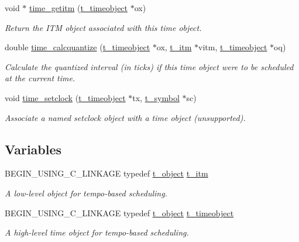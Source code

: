 \begin{DoxyCompactItemize}
void $\ast$ \hyperlink{group__time_gaa1d217d3b706f718f0f77dbd78427fb0}{time\_\-getitm} (\hyperlink{group__time_gab568d2ffd4d84ca17c0b90cf2f7c6a40}{t\_\-timeobject} $\ast$ox)
\begin{DoxyCompactList}\small\item\em Return the ITM object associated with this time object. \item\end{DoxyCompactList}\item 
double \hyperlink{group__time_gab5d282bae56be219c0c863a798140cb5}{time\_\-calcquantize} (\hyperlink{group__time_gab568d2ffd4d84ca17c0b90cf2f7c6a40}{t\_\-timeobject} $\ast$ox, \hyperlink{group__time_gac656fa1f920c69cf77e6631bcec53077}{t\_\-itm} $\ast$vitm, \hyperlink{group__time_gab568d2ffd4d84ca17c0b90cf2f7c6a40}{t\_\-timeobject} $\ast$oq)
\begin{DoxyCompactList}\small\item\em Calculate the quantized interval (in ticks) if this time object were to be scheduled at the current time. \item\end{DoxyCompactList}\item 
void \hyperlink{group__time_ga380cbe3efa2240446cb1cc2ef1195876}{time\_\-setclock} (\hyperlink{group__time_gab568d2ffd4d84ca17c0b90cf2f7c6a40}{t\_\-timeobject} $\ast$tx, \hyperlink{structt__symbol}{t\_\-symbol} $\ast$sc)
\begin{DoxyCompactList}\small\item\em Associate a named setclock object with a time object (unsupported). \item\end{DoxyCompactList}\end{DoxyCompactItemize}
\subsection*{Variables}
\begin{DoxyCompactItemize}
\item 
BEGIN\_\-USING\_\-C\_\-LINKAGE typedef \hyperlink{structt__object}{t\_\-object} \hyperlink{group__time_gac656fa1f920c69cf77e6631bcec53077}{t\_\-itm}
\begin{DoxyCompactList}\small\item\em A low-\/level object for tempo-\/based scheduling. \item\end{DoxyCompactList}\item 
BEGIN\_\-USING\_\-C\_\-LINKAGE typedef \hyperlink{structt__object}{t\_\-object} \hyperlink{group__time_gab568d2ffd4d84ca17c0b90cf2f7c6a40}{t\_\-timeobject}
\begin{DoxyCompactList}\small\item\em A high-\/level time object for tempo-\/based scheduling. \item\end{DoxyCompactList}\end{DoxyCompactItemize}


